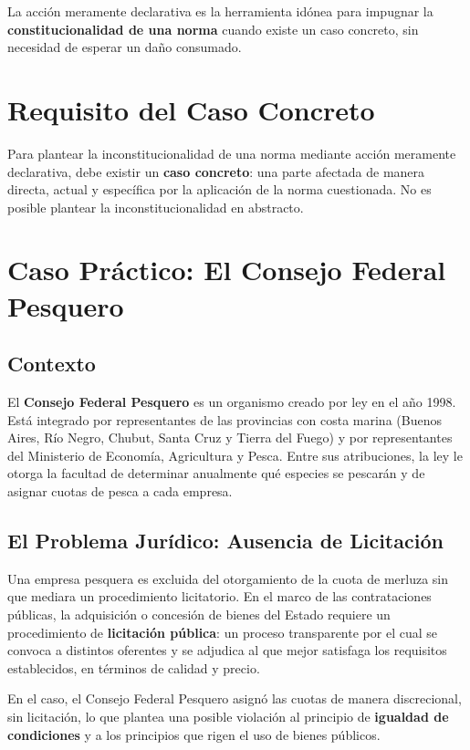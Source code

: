 \documentclass[12pt,oneside]{book}
\begin{document}
La acción meramente declarativa es la herramienta idónea para impugnar la \textbf{constitucionalidad de una norma} cuando existe un caso concreto, sin necesidad de esperar un daño consumado.

\section{Requisito del Caso Concreto}

Para plantear la inconstitucionalidad de una norma mediante acción meramente declarativa, debe existir un \textbf{caso concreto}: una parte afectada de manera directa, actual y específica por la aplicación de la norma cuestionada. No es posible plantear la inconstitucionalidad en abstracto.

\section{Caso Práctico: El Consejo Federal Pesquero}

\subsection{Contexto}

El \textbf{Consejo Federal Pesquero} es un organismo creado por ley en el año 1998. Está integrado por representantes de las provincias con costa marina (Buenos Aires, Río Negro, Chubut, Santa Cruz y Tierra del Fuego) y por representantes del Ministerio de Economía, Agricultura y Pesca. Entre sus atribuciones, la ley le otorga la facultad de determinar anualmente qué especies se pescarán y de asignar cuotas de pesca a cada empresa.

\subsection{El Problema Jurídico: Ausencia de Licitación}

Una empresa pesquera es excluida del otorgamiento de la cuota de merluza sin que mediara un procedimiento licitatorio. En el marco de las contrataciones públicas, la adquisición o concesión de bienes del Estado requiere un procedimiento de \textbf{licitación pública}: un proceso transparente por el cual se convoca a distintos oferentes y se adjudica al que mejor satisfaga los requisitos establecidos, en términos de calidad y precio.

En el caso, el Consejo Federal Pesquero asignó las cuotas de manera discrecional, sin licitación, lo que plantea una posible violación al principio de \textbf{igualdad de condiciones} y a los principios que rigen el uso de bienes públicos.
\end{document}
